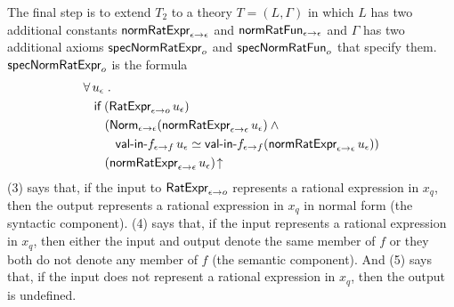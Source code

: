 \documentclass[fleqn]{llncs}
\begin{document}
\bsp The final step is to extend $T_2$ to a theory $T = (L,\Gamma)$ in
which $L$ has two additional constants $\mbox{\sf normRatExpr}_{\epsilon
  \rightarrow \epsilon}$ and $\mbox{\sf normRatFun}_{\epsilon \rightarrow
  \epsilon}$ and $\Gamma$ has two additional axioms
$\mbox{\sf specNormRatExpr}_o$ and $\mbox{\sf specNormRatFun}_o$ that
specify them.  $\mbox{\sf specNormRatExpr}_o$ is the formula
\esp
\begin{align}\label{specNormRatExpr}\setcounter{equation}{0}
&
\ForallApp u_\epsilon \mdot\\
& \hspace*{2ex}
\If \; (\mname{RatExpr}_{\epsilon \tarrow o} \, u_\epsilon)\\
& \hspace*{4ex}
(\mname{Norm}_{\epsilon \tarrow \epsilon}(\mname{normRatExpr}_{\epsilon \tarrow \epsilon} \, u_\epsilon) \And {}\\
& \hspace*{6ex}
\mname{val-in-}f_{\epsilon \tarrow f} \, u_\epsilon \QuasiEqual
\mname{val-in-}f_{\epsilon \tarrow f}(\mname{normRatExpr}_{\epsilon \tarrow \epsilon} \, u_\epsilon))\\
& \hspace*{4ex}
(\mname{normRatExpr}_{\epsilon \tarrow \epsilon} \, u_\epsilon)\IsUndefApp
\end{align}
(3) says that, if the input to $\mbox{\sf RatExpr}_{\epsilon \rightarrow o}$
represents a rational expression in $x_q$, then the output represents
a rational expression in $x_q$ in normal form (the syntactic
component).  (4) says that, if the input represents a rational
expression in $x_q$, then either the input and output denote the same
member of $f$ or they both do not denote any member of $f$ (the
semantic component).  And (5) says that, if the input does not
represent a rational expression in $x_q$, then the output is
undefined.
\end{document}
